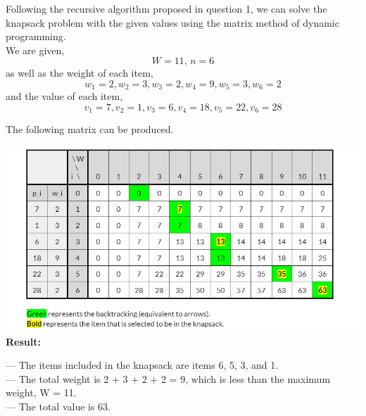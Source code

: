 \documentclass[12pt]{book}
\begin{document}
\begin{enumerate}
    Following the recursive algorithm proposed in question 1, we can solve the knapsack problem with the given values using the matrix method of dynamic programming.\\
    
    We are given,
    $$W = 11, \,n = 6$$
    as well as the weight of each item,
    $$w_1 = 2, w_2 = 3, w_3 = 2, w_4 = 9, w_5 = 3, w_6 = 2$$
    and the value of each item,
    $$v_1 = 7, v_2 = 1, v_3 = 6, v_4 = 18, v_5 = 22, v_6 = 28$$
    
    The following matrix can be produced.
    
    \includegraphics[scale=0.9]{q2.png}\\
    
    \textbf{Result:}
    
    --- The items included in the knapsack are items 6, 5, 3, and 1.\\
    --- The total weight is 2 + 3 + 2 + 2 = 9, which is less than the maximum weight, W = 11.\\
    --- The total value is 63.

    
\end{enumerate}
\end{document}
